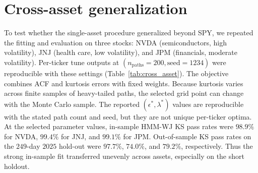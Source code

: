
\section{Cross-asset generalization}
\label{sec:supp-cross-asset}

To test whether the single-asset procedure generalized beyond SPY, we
repeated the fitting and evaluation on three stocks: NVDA
(semiconductors, high volatility), JNJ (health care, low
volatility), and JPM (financials, moderate volatility). Per-ticker
tune outputs at $(n_{\mathrm{paths}} = 200, \mathrm{seed} = 1234)$
were reproducible with these settings (Table~\ref{tab:cross_asset}).
The objective combines
ACF and kurtosis errors with fixed weights. Because kurtosis varies
across finite samples of heavy-tailed paths, the selected grid point
can change with the Monte Carlo sample. The reported
$(\epsilon^{*},\lambda^{*})$ values are reproducible with the stated
path count and seed, but they are not unique per-ticker optima. At the
selected parameter values, in-sample HMM-WJ KS pass rates were
$98.9\%$ for NVDA, $99.4\%$ for JNJ, and $99.1\%$ for JPM.
Out-of-sample KS pass rates on the $249$-day $2025$ hold-out were
$97.7\%$, $74.0\%$, and $79.2\%$, respectively. Thus the strong
in-sample fit transferred unevenly across assets, especially on the
short holdout.

